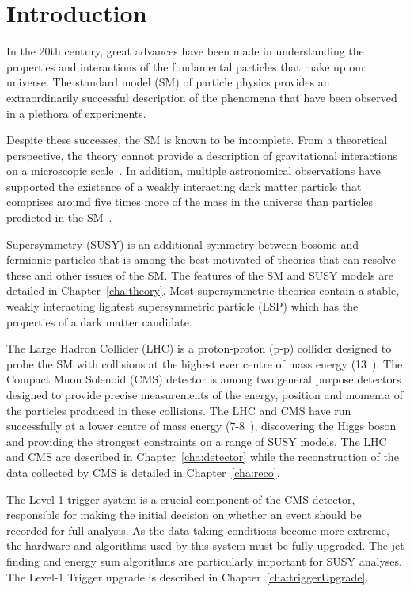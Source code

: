 \chapter{Introduction}
\label{cha:introduction}

In the 20th century, great advances have been made in
understanding the properties and interactions of 
the fundamental particles that make up our universe. 
The standard model (SM) of particle physics provides an 
extraordinarily successful description of the phenomena 
that have been observed in a plethora of experiments.

Despite these successes, the SM is known to be incomplete.
From a theoretical perspective, the theory cannot provide a description of gravitational
interactions on a microscopic scale~\cite{gravRenorm}. In addition, multiple astronomical observations 
have supported the existence of a weakly interacting dark matter particle that
comprises around five times more of the mass in the universe than particles 
predicted in the SM~\cite{WIMP}.

Supersymmetry (SUSY) is an additional symmetry between bosonic and fermionic particles 
that is among the best motivated of theories that can resolve these
and other issues of the SM. The features of the SM and SUSY models are detailed 
in Chapter~\ref{cha:theory}. Most supersymmetric theories contain a stable,
weakly interacting lightest supersymmetric particle (LSP) which has the properties 
of a dark matter candidate.

The Large Hadron Collider (LHC) is a proton-proton (p-p) collider designed to probe the 
SM with collisions at the highest ever centre of mass energy (13~\TeV).
The Compact Muon Solenoid (CMS) detector is among two general purpose detectors
designed to provide precise measurements of the energy, position and momenta of
the particles produced in these collisions. The LHC and CMS have run successfully at a lower centre of 
mass energy (7-8~\TeV), discovering the Higgs boson and providing the strongest 
constraints on a range of SUSY models. The LHC and CMS are described in Chapter~\ref{cha:detector}
while the reconstruction of the data collected by CMS is detailed in Chapter~\ref{cha:reco}.

The Level-1 trigger system is a crucial component of the CMS detector, responsible 
for making the initial decision on whether an event should be recorded 
for full analysis. As the data taking conditions become more extreme, the hardware
and algorithms used by this system must be fully upgraded. The jet finding and energy sum algorithms 
are particularly important for SUSY analyses. The Level-1 Trigger upgrade is described in 
Chapter~\ref{cha:triggerUpgrade}. 

